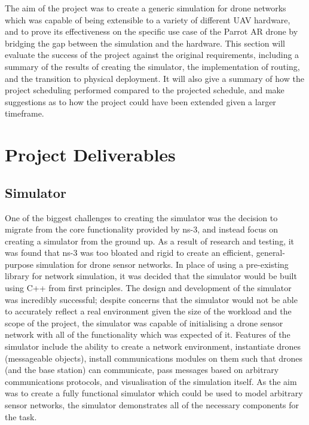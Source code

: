 The aim of the project was to create a generic simulation for drone networks which was capable of being extensible to a variety of different UAV hardware, and to prove its effectiveness on the specific use case of the Parrot AR drone by bridging the gap between the simulation and the hardware. This section will evaluate the success of the project against the original requirements, including a summary of the results of creating the simulator, the implementation of routing, and the transition to physical deployment. It will also give a summary of how the project scheduling performed compared to the projected schedule, and make suggestions as to how the project could have been extended given a larger timeframe.
	\section{Project Deliverables}
		\subsection{Simulator}
One of the biggest challenges to creating the simulator was the decision to migrate from the core functionality provided by ns-3, and instead focus on creating a simulator from the ground up. As a result of research and testing, it was found that ns-3 was too bloated and rigid to create an efficient, general-purpose simulation for drone sensor networks. In place of using a pre-existing library for network simulation, it was decided that the simulator would be built using C++ from first principles. The design and development of the simulator was incredibly successful; despite concerns that the simulator would not be able to accurately reflect a real environment given the size of the workload and the scope of the project, the simulator was capable of initialising a drone sensor network with all of the functionality which was expected of it. Features of the simulator include the ability to create a network environment, instantiate drones (messageable objects), install communications modules on them such that drones (and the base station) can communicate, pass messages based on arbitrary communications protocols, and visualisation of the simulation itself. As the aim was to create a fully functional simulator which could be used to model arbitrary sensor networks, the simulator demonstrates all of the necessary components for the task.
